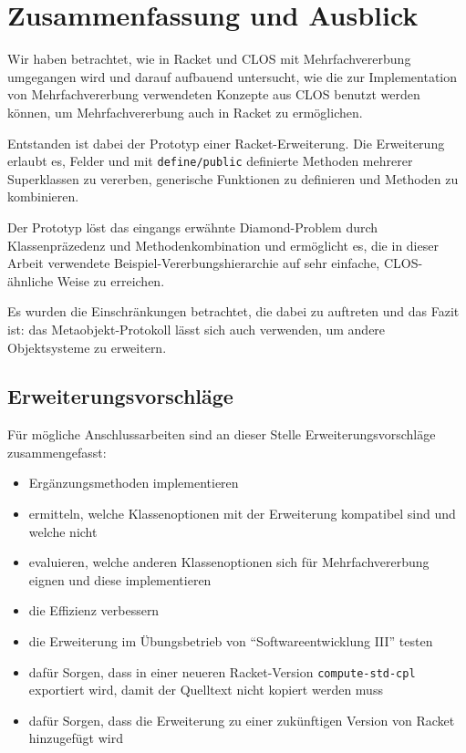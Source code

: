 \chapter{Zusammenfassung und Ausblick}
Wir haben betrachtet, wie in Racket und CLOS mit Mehrfachvererbung umgegangen wird und darauf aufbauend untersucht, wie die zur Implementation von Mehrfachvererbung verwendeten Konzepte aus CLOS benutzt werden können, um Mehrfachvererbung auch in Racket zu ermöglichen.

Entstanden ist dabei der Prototyp einer Racket-Erweiterung. Die Erweiterung erlaubt es, Felder und mit \texttt{define/public} definierte Methoden mehrerer Superklassen zu vererben, generische Funktionen zu definieren und Methoden zu kombinieren.

Der Prototyp löst das eingangs erwähnte Diamond-Problem durch Klassenpräzedenz und Methodenkombination und ermöglicht es, die in dieser Arbeit verwendete Beispiel-Vererbungshierarchie auf sehr einfache, CLOS-ähnliche Weise zu erreichen.

Es wurden die Einschränkungen betrachtet, die dabei zu auftreten und das Fazit ist: das Metaobjekt-Protokoll lässt sich auch verwenden, um andere Objektsysteme zu erweitern.

\section{Erweiterungsvorschläge}

Für mögliche Anschlussarbeiten sind an dieser Stelle Erweiterungsvorschläge zusammengefasst:
\begin{itemize}
 \item Ergänzungsmethoden implementieren
 \item ermitteln, welche Klassenoptionen mit der Erweiterung kompatibel sind und welche nicht
 \item evaluieren, welche anderen Klassenoptionen sich für Mehrfachvererbung eignen und diese implementieren
 \item die Effizienz verbessern
 \item die Erweiterung im Übungsbetrieb von ``Softwareentwicklung III'' testen
 \item dafür Sorgen, dass in einer neueren Racket-Version \texttt{compute-std-cpl} exportiert wird, damit der Quelltext nicht kopiert werden muss
 \item dafür Sorgen, dass die Erweiterung zu einer zukünftigen Version von Racket hinzugefügt wird 
\end{itemize}